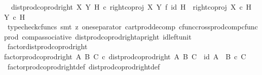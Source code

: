 \begin{isabellebody}
\ \ {\isachardoublequoteopen}dist{\isacharunderscore}{\kern0pt}prod{\isacharunderscore}{\kern0pt}coprod{\isacharunderscore}{\kern0pt}right\ X\ Y\ H\ {\isasymcirc}\isactrlsub c\ {\isacharparenleft}{\kern0pt}right{\isacharunderscore}{\kern0pt}coproj\ X\ Y\ {\isasymtimes}\isactrlsub f\ id\ H{\isacharparenright}{\kern0pt}\ {\isacharequal}{\kern0pt}\ right{\isacharunderscore}{\kern0pt}coproj\ {\isacharparenleft}{\kern0pt}X\ {\isasymtimes}\isactrlsub c\ H{\isacharparenright}{\kern0pt}\ {\isacharparenleft}{\kern0pt}Y\ {\isasymtimes}\isactrlsub c\ H{\isacharparenright}{\kern0pt}{\isachardoublequoteclose}\isanewline
%
\isadelimproof
\ \ %
\endisadelimproof
%
\isatagproof
{}\isamarkupfalse%
\ {\isacharparenleft}{\kern0pt}typecheck{\isacharunderscore}{\kern0pt}cfuncs{\isacharcomma}{\kern0pt}\ smt\ {\isacharparenleft}{\kern0pt}z{}{\isacharparenright}{\kern0pt}\ one{\isacharunderscore}{\kern0pt}separator\ cart{\isacharunderscore}{\kern0pt}prod{\isacharunderscore}{\kern0pt}decomp\ cfunc{\isacharunderscore}{\kern0pt}cross{\isacharunderscore}{\kern0pt}prod{\isacharunderscore}{\kern0pt}comp{\isacharunderscore}{\kern0pt}cfunc{\isacharunderscore}{\kern0pt}prod\ comp{\isacharunderscore}{\kern0pt}associative{}\ dist{\isacharunderscore}{\kern0pt}prod{\isacharunderscore}{\kern0pt}coprod{\isacharunderscore}{\kern0pt}right{\isacharunderscore}{\kern0pt}ap{\isacharunderscore}{\kern0pt}right\ id{\isacharunderscore}{\kern0pt}left{\isacharunderscore}{\kern0pt}unit{}{\isacharparenright}{\kern0pt}%
\endisatagproof
{\isafoldproof}%
%
\isadelimproof
\isanewline
%
\endisadelimproof
\isanewline
{}\isamarkupfalse%
\ factor{\isacharunderscore}{\kern0pt}dist{\isacharunderscore}{\kern0pt}prod{\isacharunderscore}{\kern0pt}coprod{\isacharunderscore}{\kern0pt}right{\isacharcolon}{\kern0pt}\isanewline
{\isachardoublequoteopen}factor{\isacharunderscore}{\kern0pt}prod{\isacharunderscore}{\kern0pt}coprod{\isacharunderscore}{\kern0pt}right\ A\ B\ C\ {\isasymcirc}\isactrlsub c\ dist{\isacharunderscore}{\kern0pt}prod{\isacharunderscore}{\kern0pt}coprod{\isacharunderscore}{\kern0pt}right\ A\ B\ C\ {\isacharequal}{\kern0pt}\ id\ {\isacharparenleft}{\kern0pt}{\isacharparenleft}{\kern0pt}A\ {\isasymCoprod}\ B{\isacharparenright}{\kern0pt}\ {\isasymtimes}\isactrlsub c\ C{\isacharparenright}{\kern0pt}{\isachardoublequoteclose}\isanewline
%
\isadelimproof
\ \ %
\endisadelimproof
%
\isatagproof
{}\isamarkupfalse%
\ factor{\isacharunderscore}{\kern0pt}prod{\isacharunderscore}{\kern0pt}coprod{\isacharunderscore}{\kern0pt}right{\isacharunderscore}{\kern0pt}def\ dist{\isacharunderscore}{\kern0pt}prod{\isacharunderscore}{\kern0pt}coprod{\isacharunderscore}{\kern0pt}right{\isacharunderscore}{\kern0pt}def\isanewline

\end{isabellebody}
